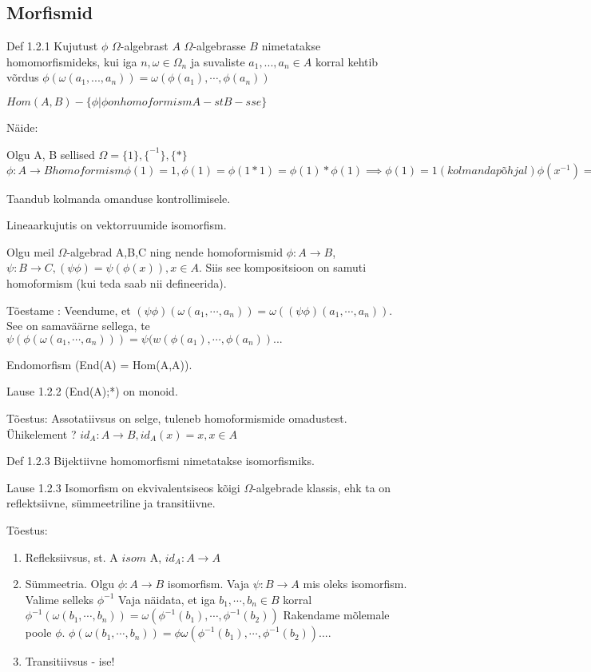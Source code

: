 \documentclass[12pt]{article}
\begin{document}
\subsection{Morfismid}

Def 1.2.1 Kujutust $\phi$ $\Omega$-algebrast $A$ $\Omega$-algebrasse $B$ nimetatakse homomorfismideks, kui iga $n, \omega \in \Omega_n$ ja suvaliste $a_1,...,a_n \in A$ korral kehtib võrdus $\phi(\omega(a_1,...,a_n)) = \omega(\phi(a_1),\cdots, \phi(a_n))$

$Hom(A,B) - \{\phi | \phi on homoformism A-st B-sse\}$

Näide:

Olgu A, B sellised $\Omega = \{1\}, \{ ^{-1}\}, \{*\}$
$\phi : A \rightarrow B homoformism
\phi(1) = 1, \phi(1) = \phi(1*1) = \phi(1)*\phi(1) \implies \phi(1) = 1 (kolmanda põhjal)
\phi(x^{-1}) = \phi(x)^{-1}, 1 = \phi(1) = \phi(x^{-1}x) = \phi(x^{-1})\phi(x) (kolmanda põhjal)
\phi(xy) = \phi(x)\phi(y)$

Taandub kolmanda omanduse kontrollimisele.


Lineaarkujutis on vektorruumide isomorfism.

Olgu meil $\Omega$-algebrad A,B,C ning nende homoformismid $\phi : A \rightarrow B$, $\psi : B \rightarrow C, (\psi \phi ) = \psi (\phi ( x)), x \in A$. Siis see kompositsioon on samuti homoformism (kui teda saab nii defineerida). 

Tõestame : Veendume, et $(\psi\phi)(\omega(a_1,\cdots, a_n)) = \omega((\psi \phi)(a_1,\cdots,a_n))$. See on samaväärne sellega, te $\psi(\phi(\omega(a_1,\cdots,a_n))) = \psi(w(\phi(a_1),\cdots, \phi(a_n)) ...$

Endomorfism (End(A) = Hom(A,A)).

Lause 1.2.2 (End(A);*) on monoid. 

Tõestus: Assotatiivsus on selge, tuleneb homoformismide omadustest. \"Uhikelement ? $id_A : A \rightarrow B, id_{A}(x) = x, x \in A$

Def 1.2.3 Bijektiivne homomorfismi nimetatakse isomorfismiks. 

Lause 1.2.3 Isomorfism on ekvivalentsiseos kõigi $\Omega$-algebrade klassis, ehk ta on reflektsiivne, s\"ummeetriline ja transitiivne. 

Tõestus:
\begin{enumerate}
\item Refleksiivsus, st. A $isom$ A, $id_A: A \rightarrow A$
\item S\"ummeetria. Olgu $ \phi : A \rightarrow B$ isomorfism. Vaja $ \psi : B \rightarrow A$ mis oleks isomorfism. Valime selleks $\phi^{-1}$ Vaja näidata, et iga  $b_1,\cdots,b_n \in B$ korral $\phi^{-1} (\omega(b_1,\cdots, b_n)) = \omega(\phi^{-1}(b_1), \cdots, \phi^{-1}(b_2))$ Rakendame mõlemale poole $\phi$. $\phi(\omega(b_1,\cdots, b_n)) = \phi \omega(\phi^{-1}(b_1), \cdots, \phi^{-1}(b_2)) .... $
\item Transitiivsus - ise! 
\end{enumerate}
\end{document}
